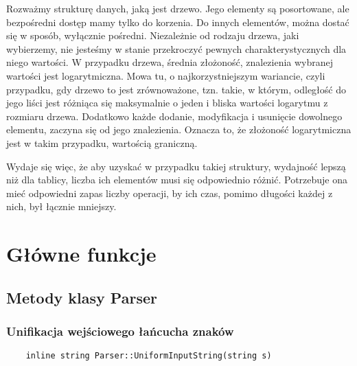 \documentclass[oneside,a4paper]{book}
\begin{document}
	Rozważmy strukturę danych, jaką jest drzewo. Jego elementy są posortowane, ale bezpośredni dostęp mamy tylko do korzenia. Do innych elementów, można dostać się w sposób, wyłącznie pośredni. Niezależnie od rodzaju drzewa, jaki wybierzemy, nie jesteśmy w stanie przekroczyć pewnych charakterystycznych dla niego wartości. W przypadku drzewa, średnia złożoność, znalezienia wybranej wartości jest logarytmiczna. Mowa tu, o najkorzystniejszym wariancie, czyli przypadku, gdy drzewo to jest zrównoważone, tzn. takie, w którym, odległość do jego liści jest różniąca się maksymalnie o jeden i bliska wartości logarytmu z rozmiaru drzewa. Dodatkowo każde dodanie, modyfikacja i usunięcie dowolnego elementu, zaczyna się od jego znalezienia. Oznacza to, że złożoność logarytmiczna jest w takim przypadku, wartością graniczną.
	
	Wydaje się więc, że aby uzyskać w przypadku takiej struktury, wydajność lepszą niż dla tablicy, liczba ich elementów musi się odpowiednio różnić. Potrzebuje ona mieć odpowiedni zapas liczby operacji, by ich czas, pomimo długości każdej z nich, był łącznie mniejszy.
	
	
	\section{Główne funkcje}
	
	\subsection{Metody klasy Parser}
	
	\subsubsection{Unifikacja wejściowego łańcucha znaków}
	\begin{lstlisting}
	inline string Parser::UniformInputString(string s)
	\end{lstlisting}
	
\end{document}
